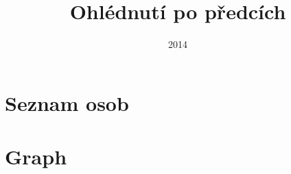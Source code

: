 \documentclass[a4paper,11pt]{book}
\title{Ohlédnutí po předcích}
\author{}
\date{2014}
\begin{document}
\frontmatter

\maketitle

\tableofcontents

\newcommand{\wwii}{\index{Druhá světová válka}}

%
%
%
\mainmatter



\appendix

\chapter{Seznam osob}



\chapter{Graph}



\backmatter

\printindex

{}

\end{document}
